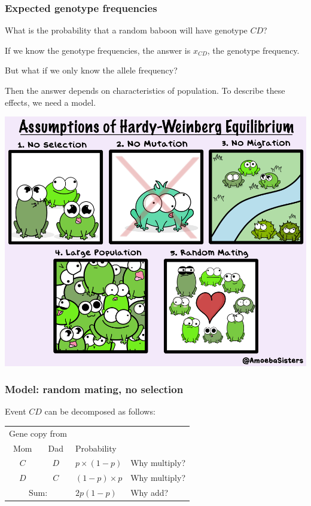 \documentclass[handout]{beamer}
\begin{document}
\begin{frame}
\frametitle{Expected genotype frequencies}

What is the probability that a random baboon will have genotype $CD$?

\bigskip
\pause

If we know the genotype frequencies, the answer is $x_{CD}$, the
genotype frequency.

\bigskip
But what if we only know the allele frequency?

\bigskip
\pause

Then the answer depends on characteristics of population.  \pause To
describe these effects, we need a model.
\end{frame}

\begin{frame}
\includegraphics[width=\linewidth]{hwequil.png}
\end{frame}

\begin{frame}
\frametitle{Model: random mating, no selection}

Event $CD$ can be decomposed as follows:
\begin{center}
\begin{tabular}{ccll}
\multicolumn{2}{c}{Gene copy from}\\ \cline{1-2}
Mom  & Dad & Probability\\
\cline{1-3}
$C$  & $D$ & $p \times (1-p)$ & \hspace{2em}Why multiply?\\
$D$  & $C$ & $(1-p) \times p$ & \hspace{2em}Why multiply?\\
\cline{1-3}
\multicolumn{2}{c}{Sum:} & $2p(1-p)$ & \hspace{2em}Why add?
\end{tabular}
\end{center}
\end{frame}
\end{document}
